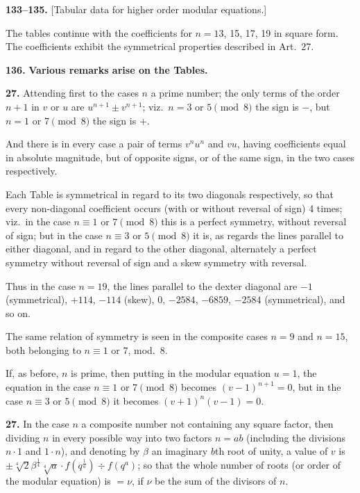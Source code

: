 \documentclass[11pt,a4paper]{article}
\theoremstyle{plain}
\begin{document}
\medskip
\noindent\textbf{133--135.} [Tabular data for higher order modular equations.]

The tables continue with the coefficients for $n = 13$, 15, 17, 19 in square form. The coefficients exhibit the symmetrical properties described in Art.~27.

\medskip
\noindent\textbf{136.} \textbf{Various remarks arise on the Tables.}

\medskip
\noindent\textbf{27.} Attending first to the cases $n$ a prime number; the only terms of the order $n + 1$ in $v$ or $u$ are $u^{n+1} \pm v^{n+1}$; viz.\ $n = 3$ or $5 \pmod{8}$ the sign is $-$, but $n = 1$ or $7 \pmod{8}$ the sign is $+$.

And there is in every case a pair of terms $v^n u^n$ and $vu$, having coefficients equal in absolute magnitude, but of opposite signs, or of the same sign, in the two cases respectively.

Each Table is symmetrical in regard to its two diagonals respectively, so that every non-diagonal coefficient occurs (with or without reversal of sign) 4 times; viz.\ in the case $n \equiv 1$ or $7 \pmod{8}$ this is a perfect symmetry, without reversal of sign; but in the case $n \equiv 3$ or $5 \pmod{8}$ it is, as regards the lines parallel to either diagonal, and in regard to the other diagonal, alternately a perfect symmetry without reversal of sign and a skew symmetry with reversal.

Thus in the case $n = 19$, the lines parallel to the dexter diagonal are $-1$ (symmetrical), $+114$, $-114$ (skew), $0$, $-2584$, $-6859$, $-2584$ (symmetrical), and so on.

The same relation of symmetry is seen in the composite cases $n = 9$ and $n = 15$, both belonging to $n \equiv 1$ or $7$, mod.~8.

If, as before, $n$ is prime, then putting in the modular equation $u = 1$, the equation in the case $n \equiv 1$ or $7 \pmod{8}$ becomes $(v - 1)^{n+1} = 0$, but in the case $n \equiv 3$ or $5 \pmod{8}$ it becomes $(v + 1)^n(v - 1) = 0$.

\medskip
\noindent\textbf{27.} In the case $n$ a composite number not containing any square factor, then dividing $n$ in every possible way into two factors $n = ab$ (including the divisions $n \cdot 1$ and $1 \cdot n$), and denoting by $\beta$ an imaginary $b$th root of unity, a value of $v$ is $\pm\sqrt[4]{2}\beta^{\frac{1}{4}}\sqrt[4]{a} \cdot f(q^{\frac{1}{a}}) \div f(q^a)$; so that the whole number of roots (or order of the modular equation) is $= \nu$, if $\nu$ be the sum of the divisors of $n$.
\end{document}
